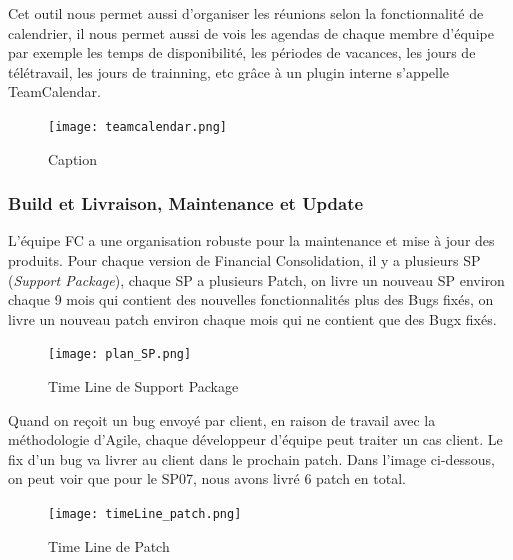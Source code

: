         \par Cet outil nous permet aussi d'organiser les réunions selon la fonctionnalité de calendrier, il nous permet aussi de vois les agendas de chaque membre d'équipe par exemple les temps de disponibilité, les périodes de vacances, les jours de télétravail, les jours de trainning, etc grâce à un plugin interne s'appelle TeamCalendar.
        \begin{figure}[H]
            \centering
            \texttt{[image: teamcalendar.png]}
            \caption{Caption}
            \label{fig:my_label}
        \end{figure}
    \newpage
    
    \subsubsection{Build et Livraison, Maintenance et Update}
    L'équipe FC a une organisation robuste pour la maintenance et mise à jour des produits. Pour chaque version de Financial Consolidation, il y a plusieurs SP (\textit{Support Package}), chaque SP a plusieurs Patch, on livre un nouveau SP environ chaque 9 mois qui contient des nouvelles fonctionnalités plus des Bugs fixés, on livre un nouveau patch environ chaque mois qui ne contient que des Bugx fixés.
    \begin{figure}[H]
        \centering
        \texttt{[image: plan\_SP.png]}
        \caption{Time Line de Support Package}
        \label{fig:tileLine_sp}
    \end{figure}
    \par Quand on reçoit un bug envoyé par client,  en raison de travail avec la méthodologie d'Agile, chaque développeur d'équipe peut traiter un cas client. Le fix d'un bug va livrer au client dans le prochain patch. Dans l'image ci-dessous, on peut voir que pour le SP07, nous avons livré 6 patch en total.
    
    \begin{figure}[H]
        \centering
        \texttt{[image: timeLine\_patch.png]}
        \caption{Time Line de Patch}
        \label{fig:timeLine_Path}
    \end{figure}
